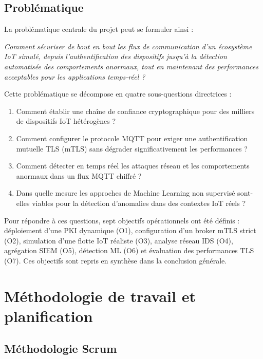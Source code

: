 \subsection{Problématique}

La problématique centrale du projet peut se formuler ainsi :

\begin{tcolorbox}[colback=blue!5, colframe=blue!50!black, title=Problématique]
\textit{Comment sécuriser de bout en bout les flux de communication d'un écosystème IoT simulé, depuis l'authentification des dispositifs jusqu'à la détection automatisée des comportements anormaux, tout en maintenant des performances acceptables pour les applications temps-réel ?}
\end{tcolorbox}

Cette problématique se décompose en quatre sous-questions directrices :

\begin{enumerate}
  \item Comment établir une chaîne de confiance cryptographique pour des milliers de dispositifs IoT hétérogènes ?
  \item Comment configurer le protocole MQTT pour exiger une authentification mutuelle TLS (mTLS) sans dégrader significativement les performances ?
  \item Comment détecter en temps réel les attaques réseau et les comportements anormaux dans un flux MQTT chiffré ?
  \item Dans quelle mesure les approches de Machine Learning non supervisé sont-elles viables pour la détection d'anomalies dans des contextes IoT réels ?
\end{enumerate}

Pour répondre à ces questions, sept objectifs opérationnels ont été définis : déploiement d'une PKI dynamique (O1), configuration d'un broker mTLS strict (O2), simulation d'une flotte IoT réaliste (O3), analyse réseau IDS (O4), agrégation SIEM (O5), détection ML (O6) et évaluation des performances TLS (O7). Ces objectifs sont repris en synthèse dans la conclusion générale.

\section{Méthodologie de travail et planification}

\subsection{Méthodologie Scrum}

